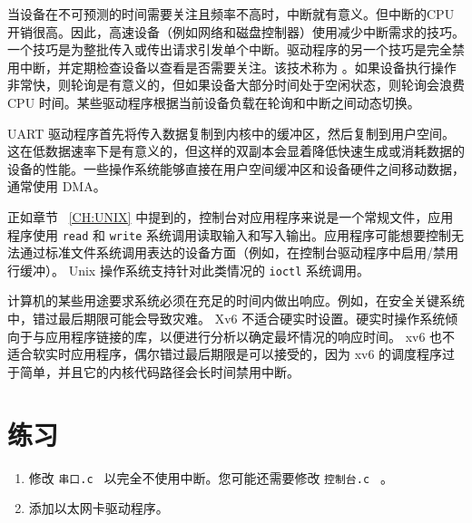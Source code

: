\documentclass[UTF8]{article}
\begin{document}
当设备在不可预测的时间需要关注且频率不高时，中断就有意义。但中断的CPU开销很高。因此，高速设备（例如网络和磁盘控制器）使用减少中断需求的技巧。一个技巧是为整批传入或传出请求引发单个中断。驱动程序的另一个技巧是完全禁用中断，并定期检查设备以查看是否需要关注。该技术称为        。如果设备执行操作非常快，则轮询是有意义的，但如果设备大部分时间处于空闲状态，则轮询会浪费 CPU 时间。某些驱动程序根据当前设备负载在轮询和中断之间动态切换。  

UART 驱动程序首先将传入数据复制到内核中的缓冲区，然后复制到用户空间。这在低数据速率下是有意义的，但这样的双副本会显着降低快速生成或消耗数据的设备的性能。一些操作系统能够直接在用户空间缓冲区和设备硬件之间移动数据，通常使用 DMA。  

正如章节~    \ref{CH:UNIX}    中提到的，控制台对应用程序来说是一个常规文件，应用程序使用    \lstinline{read}    和    \lstinline{write}    系统调用读取输入和写入输出。应用程序可能想要控制无法通过标准文件系统调用表达的设备方面（例如，在控制台驱动程序中启用/禁用行缓冲）。 Unix 操作系统支持针对此类情况的    \lstinline{ioctl}    系统调用。  

计算机的某些用途要求系统必须在充足的时间内做出响应。例如，在安全关键系统中，错过最后期限可能会导致灾难。 Xv6 不适合硬实时设置。硬实时操作系统倾向于与应用程序链接的库，以便进行分析以确定最坏情况的响应时间。 xv6 也不适合软实时应用程序，偶尔错过最后期限是可以接受的，因为 xv6 的调度程序过于简单，并且它的内核代码路径会长时间禁用中断。  

   \section{练习  }     

   \begin{enumerate}


   \item   修改  {    \tt    串口.c   }  以完全不使用中断。您可能还需要修改  {    \tt    控制台.c   } 。   \item   添加以太网卡驱动程序。  \end{enumerate}     
\end{document}
